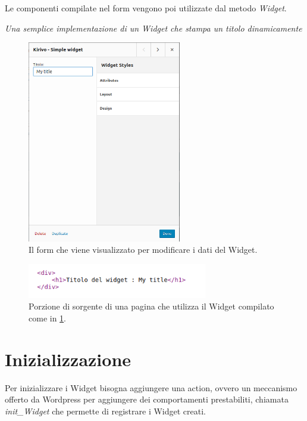 Le componenti compilate nel form vengono poi utilizzate dal metodo \emph{Widget}.



\emph{Una semplice implementazione di un Widget che stampa un titolo dinamicamente}


\begin{figure}
  \includegraphics[width=0.6\textwidth]{figure/wid_form.png}
  \caption{Il form che viene visualizzato per modificare i dati del Widget.}
  \label{fig:wform}
\end{figure}
\begin{figure}
  \includegraphics[width=0.7\textwidth]{figure/sourcewid.png}
  \caption{Porzione di sorgente di una pagina che utilizza il Widget compilato come in \ref{fig:wform}.}
  \label{fig:wsource}
\end{figure}

\newpage

\section{Inizializzazione}
Per inizializzare i Widget bisogna aggiungere una action\cite{WPACTION}, ovvero un meccanismo offerto da Wordpress per aggiungere dei comportamenti
prestabiliti,  chiamata \emph{init\_Widget} che permette di registrare i Widget creati.

